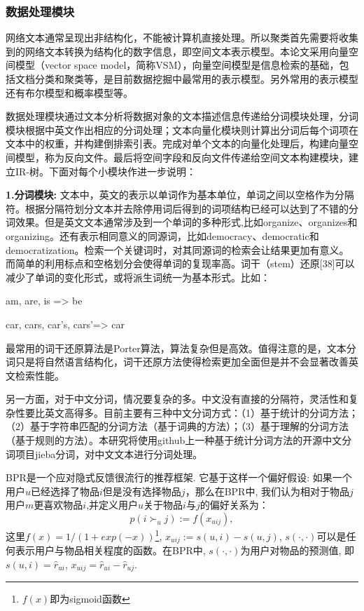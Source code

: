 \subsubsection{数据处理模块}

网络文本通常呈现出非结构化，不能被计算机直接处理。所以聚类首先需要将收集到的网络文本转换为结构化的数字信息，即空间文本表示模型。本论文采用向量空间模型（vector space model，简称VSM），向量空间模型是信息检索的基础，包括文档分类和聚类等，是目前数据挖掘中最常用的表示模型。另外常用的表示模型还有布尔模型和概率模型等。

数据处理模块通过文本分析将数据对象的文本描述信息传递给分词模块处理，分词模块根据中英文作出相应的分词处理；文本向量化模块则计算出分词后每个词项在文本中的权重，并构建倒排索引表。完成对单个文本的向量化处理后，构建向量空间模型，称为反向文件。最后将空间字段和反向文件传递给空间文本构建模块，建立IR-树。下面对每个小模块作进一步说明：

\textbf{1.分词模块:} 文本中，英文的表示以单词作为基本单位，单词之间以空格作为分隔符。根据分隔符划分文本并去除停用词后得到的词项结构已经可以达到了不错的分词效果。但是英文文本通常涉及到一个单词的多种形式,比如organize、organizes和organizing。还有表示相同意义的同源词，比如democracy、democratic和democratization。检索一个关键词时，对其同源词的检索会让结果更加有意义。而简单的利用标点和空格划分会使得单词的复现率高。词干（stem）还原[38]可以减少了单词的变化形式，或将派生词统一为基本形式。比如：

am, are, is => be

car, cars, car’s, cars’=> car

最常用的词干还原算法是Porter算法，算法复杂但是高效。值得注意的是，文本分词只是将自然语言结构化，词干还原方法使得检索更加全面但是并不会显著改善英文检索性能。

另一方面，对于中文分词，情况要复杂的多。中文没有直接的分隔符，灵活性和复杂性要比英文高得多。目前主要有三种中文分词方式：（1）基于统计的分词方法；（2）基于字符串匹配的分词方法（基于词典的方法）；（3）基于理解的分词方法（基于规则的方法）。本研究将使用github上一种基于统计分词方法的开源中文分词项目jieba分词，对中文文本进行分词处理。

BPR是一个应对隐式反馈很流行的推荐框架. 它基于这样一个偏好假设: 如果一个用户$u$已经选择了物品$i$但是没有选择物品$j$，那么在BPR中, 我们认为相对于物品$j$用户$m$更喜欢物品$i$,并定义用户$u$关于物品$i$与$j$的偏好关系为：
\begin{equation}
\label{pairwisepre}
p \left( i \succ_u j \right) := f \left( x_{uij} \right),
\end{equation}
这里$f \left(x\right) = 1/\left(1+exp\left(-x\right)\right)$\footnote{$f \left(x\right)$即为sigmoid函数}, $x_{uij} := s\left(u,i\right) - s\left(u,j\right)$, $s\left(\cdot,\cdot\right)$可以是任何表示用户与物品相关程度的函数。在BPR中, $s\left(\cdot,\cdot\right)$为用户对物品的预测值, 即$s\left(u,i\right) = \hat{r}_{ui}$, $x_{uij} = \hat{r}_{ui}-\hat{r}_{uj}$.


